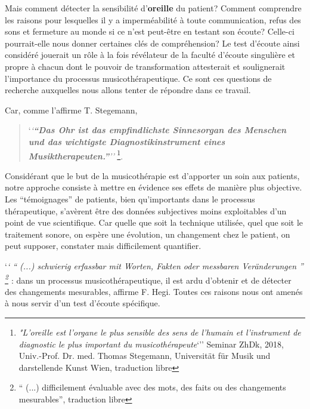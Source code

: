 Mais comment détecter la sensibilité d'\textbf{oreille} du patient?
Comment comprendre les raisons pour lesquelles il y a imperméabilité à toute communication, refus des sons et fermeture au monde si ce n'est
peut-être en testant
son écoute?  Celle-ci pourrait-elle nous donner certaines clés de compréhension?
Le test d'écoute ainsi considéré jouerait un rôle à la fois révélateur de la faculté d'écoute singulière et 
propre à chacun dont le  pouvoir de transformation attesterait  et soulignerait l'importance du processus 
musicothérapeutique.
Ce sont ces questions de recherche auxquelles nous allons tenter de répondre dans ce travail.


Car, comme l'affirme T. Stegemann,

\begin{quotation}
	
	`\textit{`\textbf{``Das Ohr ist das empfindlichste
    Sinnesorgan des Menschen und das wichtigste Diagnostikinstrument
    eines Musiktherapeuten.''}''\autocite [44]{seminar_zuerich}}
\footnote{ \textit{"L'oreille est l'organe le plus sensible des sens de l'humain
et l'instrument de diagnostic  le plus important du
musicothérapeute}`'' Seminar  ZhDk, 2018,
Univ.-Prof. Dr. med. Thomas Stegemann, Universität für Musik und darstellende Kunst Wien, traduction libre}.
 \end{quotation}


Considérant que le but de la musicothérapie est d'apporter un soin aux patients,
notre  approche consiste à mettre en évidence ses effets de manière
plus objective. Les ``témoignages'' de patients, bien qu'importants dans le processus thérapeutique,
s'avèrent être des données subjectives moins exploitables d'un
point de vue scientifique. %
Car quelle que soit la technique utilisée, quel que soit
le traitement sonore, on espère une évolution, un changement chez le patient, on peut supposer, constater
 mais
 difficilement quantifier.
 
 `\textit{` \enquote{ (...) schwierig erfassbar mit Worten, Fakten oder messbaren 
 Veränderungen } \footnote { \enquote{ (...) difficilement évaluable avec des mots, des faits ou des 
 changements  
 	mesurables}, traduction libre} \autocite[175]{hegi_improvisation_1993}} : dans un processus 
 	musicothérapeutique, il  
 est ardu d'obtenir et de détecter  des changements mesurables, 
  affirme F. Hegi.
 Toutes ces raisons nous ont amenés à nous servir d'un test d'écoute
 spécifique.%
 
